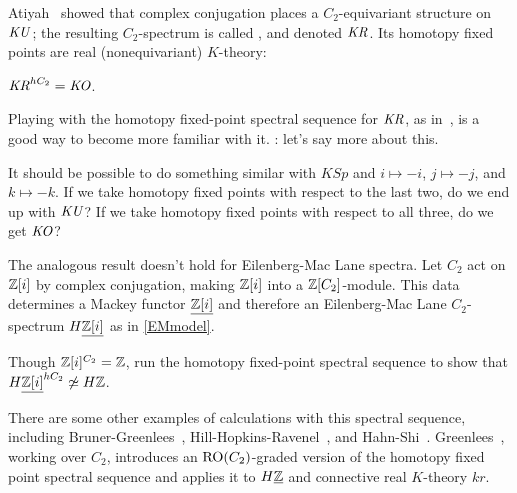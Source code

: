 \begin{exm}
Atiyah~\cite{AtiyahKR} showed that complex conjugation places a $C_2$-equivariant structure on $\mathit{KU}$; the resulting
$C_2$-spectrum is called , and denoted $\mathit{KR}$. Its homotopy fixed points are real
(nonequivariant) $K$-theory:
\begin{thm}
$\mathit{KR}^{hC_2} = \mathit{KO}$.
\end{thm}
Playing with the homotopy fixed-point spectral sequence for $\mathit{KR}$, as in~\cite{HS14}, is a good way to become more
familiar with it. \TODO: let's say more about this.
\end{exm}
\begin{ques}
It should be possible to do something similar with $\mathit{KSp}$ and $i\mapsto -i$, $j\mapsto -j$, and $k\mapsto
-k$. If we take homotopy fixed points with respect to the last two, do we end up with $\mathit{KU}$? If we take homotopy
fixed points with respect to all three, do we get $\mathit{KO}$?
\end{ques}
\begin{ex}
The analogous result doesn't hold for Eilenberg-Mac Lane spectra. Let $C_2$ act on $\mathbb Z[i]$ by complex conjugation,
making $\mathbb Z[i]$ into a $\mathbb Z[C_2]$-module. This data determines a Mackey functor $\underline{\mathbb Z[i]}$ and therefore an
Eilenberg-Mac Lane $C_2$-spectrum $H\underline{\mathbb Z[i]}$ as in \cref{EMmodel}.

Though $\mathbb Z[i]^{C_2} = \mathbb Z$, run the homotopy fixed-point spectral sequence to show that
$H\underline{\mathbb Z[i]}^{hC_2}\not\simeq H\mathbb Z$.
\end{ex}
There are some other examples of calculations with this spectral sequence, including Bruner-Greenlees~\cite{BG10},
Hill-Hopkins-Ravenel~\cite{HHREO2, HHR}, and Hahn-Shi~\cite{HS17}. Greenlees~\cite{GreenCalc}, working over $C_2$,
introduces an $\mathrm{RO}(C_2)$-graded version of the homotopy fixed point spectral sequence and applies it to
$H\underline{\mathbb Z}$ and connective real $K$-theory $\mathit{kr}$.
